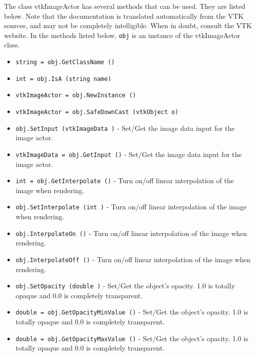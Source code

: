 The class vtkImageActor has several methods that can be used.
  They are listed below.
Note that the documentation is translated automatically from the VTK sources,
and may not be completely intelligible.  When in doubt, consult the VTK website.
In the methods listed below, \verb|obj| is an instance of the vtkImageActor class.
\begin{itemize}
\item  \verb|string = obj.GetClassName ()|

\item  \verb|int = obj.IsA (string name)|

\item  \verb|vtkImageActor = obj.NewInstance ()|

\item  \verb|vtkImageActor = obj.SafeDownCast (vtkObject o)|

\item  \verb|obj.SetInput (vtkImageData )| -  Set/Get the image data input for the image actor.  

\item  \verb|vtkImageData = obj.GetInput ()| -  Set/Get the image data input for the image actor.  

\item  \verb|int = obj.GetInterpolate ()| -  Turn on/off linear interpolation of the image when rendering.

\item  \verb|obj.SetInterpolate (int )| -  Turn on/off linear interpolation of the image when rendering.

\item  \verb|obj.InterpolateOn ()| -  Turn on/off linear interpolation of the image when rendering.

\item  \verb|obj.InterpolateOff ()| -  Turn on/off linear interpolation of the image when rendering.

\item  \verb|obj.SetOpacity (double )| -  Set/Get the object's opacity. 1.0 is totally opaque and 0.0 is completely
 transparent.

\item  \verb|double = obj.GetOpacityMinValue ()| -  Set/Get the object's opacity. 1.0 is totally opaque and 0.0 is completely
 transparent.

\item  \verb|double = obj.GetOpacityMaxValue ()| -  Set/Get the object's opacity. 1.0 is totally opaque and 0.0 is completely
 transparent.


\end{itemize}
